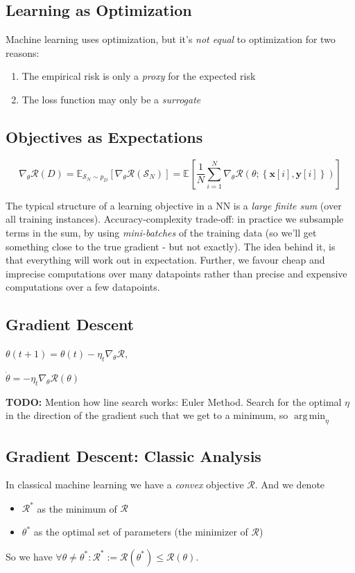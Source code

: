 \documentclass[a2paper,8pt]{extarticle}
\newcommand{\tcg}[1]{\textcolor{lighttext}{#1}}
\newcommand{\tcg}[1]{\textcolor{green}{#1}}
\newcommand{\cR}{\mathcal{R}}
\newcommand{\cS}{\mathcal{S}}
\newcommand{\set}[1]{\left\{ #1 \right\}}
\newcommand{\Exp}[2][]{{\mathbb{E}_{#1}}\left[ #2
\right]}
\DeclareMathOperator*{\argmin}{arg\,min}
\renewcommand{\vec}[1]{\mathbf{#1}}
\newcommand{\vx}{\vec{x}}
\newcommand{\vy}{\vec{y}}
\newcommand{\todo}[1]{\textbf{TODO:} #1}
\newcommand{\todo}[1]{%
}
\begin{document}
\begin{landscape}
\begin{multicols*}{7}
\subsection{Learning as Optimization}

Machine learning uses optimization, but it's \emph{not equal} to optimization
for two reasons:
\begin{enumerate}
  \item The empirical risk is only a \emph{proxy} for the expected risk
  \item The loss function may only be a \emph{surrogate}
\end{enumerate}

\subsection{Objectives as Expectations}

\[
\nabla_{\theta}\cR(D)
=
\Exp[\cS_N\sim p_D]{\nabla_{\theta}\cR(\cS_N)}
=
\Exp{
\frac{1}{N}
\sum_{i=1}^N
\nabla_{\theta}\cR(\theta;\set{\vx[i],\vy[i]})
}
\]

The typical structure of a learning objective in a NN is a \emph{large finite
sum} (over all training instances). Accuracy-complexity trade-off: in practice
we subsample terms in the sum, by using \emph{mini-batches} of the training data 
(so we'll get something close to the true gradient - but not exactly). The idea
behind it, is that everything will work out in expectation. Further, we favour
cheap and imprecise computations over many datapoints rather than precise and
expensive computations over a few datapoints.

\subsection{Gradient Descent}

$
\theta(t+1)=\theta(t)-\eta_t\nabla_\theta\cR,
$

$
\dot{\theta}=-\eta_t\nabla_\theta\cR(\theta)
$

\todo{Mention how line search works: Euler Method. Search for the optimal
$\eta$ in the direction of the gradient such that we get to a minimum, so
$\argmin_\eta$}

\subsection{Gradient Descent: Classic Analysis}

In classical machine learning we have a \tcg{\emph{convex}} objective $\cR$. And
we denote
\begin{itemize}
  \item $\cR^*$ as the minimum of $\cR$
  \item $\theta^*$ as the optimal set of parameters (the minimizer of $\cR$)
\end{itemize}
So we have
$
\forall\theta\neq\theta^*\colon\cR^*:=\cR(\theta^*)\leq\cR(\theta).
$


\end{multicols*}
\end{landscape}
\end{document}
